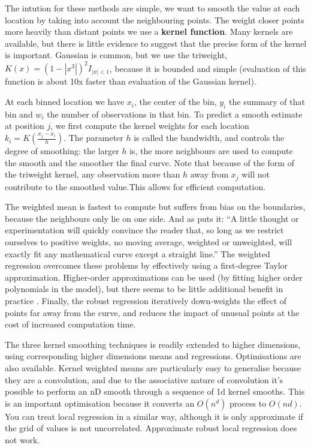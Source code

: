 \documentclass[journal]{vgtc}                %
\begin{document}
The intution for these methods are simple, we want to smooth the value at each location by taking into account the neighbouring points. The weight closer points more heavily than distant points we use a {\bf kernel function}. Many kernels are available, but there is little evidence to suggest that the precise form of the kernel is important. Gaussian is common, but we use the triweight, $K(x) = (1 - |x^3|)^2 I_{|x| < 1}$, because it is bounded and simple (evaluation of this function is about 10x faster than evaluation of the Gaussian kernel).  

At each binned location we have $x_i$, the center of the bin, $y_i$ the summary of that bin and $w_i$ the number of observations in that bin. To predict a smooth estimate at position $j$, we first compute the kernel weights for each location $k_i = K(\frac{x_j - x_i}{h})$. The parameter $h$ is called the bandwidth, and controls the degree of smoothing: the larger $h$ is, the more neighbours are used to compute the smooth and the smoother the final curve. Note that because of the form of the triweight kernel, any observation more than $h$ away from $x_j$ will not contribute to the smoothed value.This allows for efficient computation.

The weighted mean is fastest to compute but suffers from bias on the boundaries, because the neighbours only lie on one side. And as \citep{macaulay:1931} puts it: ``A little thought or experimentation will quickly convince the reader that, so long as we restrict ourselves to positive weights, no moving average, weighted or unweighted, will exactly fit any mathematical curve except a straight line.'' The weighted regression overcomes these problems by effectively using a first-degree Taylor approximation. Higher-order approximations can be used (by fitting higher order polynomials in the model), but there seems to be little additional benefit in practice \citep{cleveland:1996}.  Finally, the robust regression iteratively down-weights the effect of points far away from the curve, and reduces the impact of unusual points at the cost of increased computation time.

The three kernel smoothing techniques is readily extended to higher dimensions, using corresponding higher dimensions means and regressions. Optimisations are also available. Kernel weighted means are particularly easy to generalise because they are a convolution, and due to the associative nature of convolution it's possible to perform an nD smooth through a sequence of 1d kernel smooths. This is an important optimisation because it converts an $O(n^d)$ process to $O(nd)$.  You can treat local regression in a similar way, although it is only approximate if the grid of values is not uncorrelated. Approximate robust local regression does not work.
\end{document}

